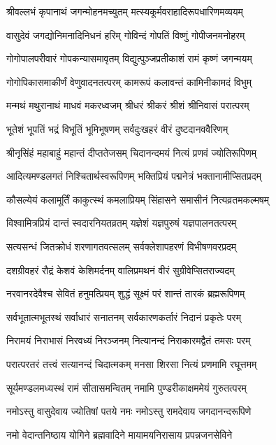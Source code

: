 \twolineshloka
{श्रीवल्लभं कृपानाथं जगन्मोहनमच्युतम्}
{मत्स्यकूर्मवराहादिरूपधारिणमव्ययम्}%

\twolineshloka
{वासुदेवं जगद्योनिमनादिनिधनं हरिम्}
{गोविन्दं गोपतिं विष्णुं गोपीजनमनोहरम्}%

\twolineshloka
{गोगोपालपरीवारं गोपकन्यासमावृतम्}
{विद्युत्पुञ्जप्रतीकाशं रामं कृष्णं जगन्मयम्}%

\twolineshloka
{गोगोपिकासमाकीर्णं वेणुवादनतत्परम्}
{कामरूपं कलावन्तं कामिनीकामदं विभुम्}%

\twolineshloka
{मन्मथं मथुरानाथं माधवं मकरध्वजम्}
{श्रीधरं श्रीकरं श्रीशं श्रीनिवासं परात्परम्}%

\twolineshloka
{भूतेशं भूपतिं भद्रं विभूतिं भूमिभूषणम्}
{सर्वदुःखहरं वीरं दुष्टदानववैरिणम्}%

\twolineshloka
{श्रीनृसिंहं महाबाहुं महान्तं दीप्ततेजसम्}
{चिदानन्दमयं नित्यं प्रणवं ज्योतिरूपिणम्}%

\twolineshloka
{आदित्यमण्डलगतं निश्चितार्थस्वरूपिणम्}
{भक्तिप्रियं पद्मनेत्रं भक्तानामीप्सितप्रदम्}%

\twolineshloka
{कौसल्येयं कलामूर्तिं काकुत्स्थं कमलाप्रियम्}
{सिंहासने समासीनं नित्यव्रतमकल्मषम्}%

\twolineshloka
{विश्वामित्रप्रियं दान्तं स्वदारनियतव्रतम्}
{यज्ञेशं यज्ञपुरुषं यज्ञपालनतत्परम्}%

\twolineshloka
{सत्यसन्धं जितक्रोधं शरणागतवत्सलम्}
{सर्वक्लेशापहरणं विभीषणवरप्रदम्}%

\twolineshloka
{दशग्रीवहरं रौद्रं केशवं केशिमर्दनम्}
{वालिप्रमथनं वीरं सुग्रीवेप्सितराज्यदम्}%

\twolineshloka
{नरवानरदेवैश्च सेवितं हनुमत्प्रियम्}
{शुद्धं सूक्ष्मं परं शान्तं तारकं ब्रह्मरूपिणम्}%

\twolineshloka
{सर्वभूतात्मभूतस्थं सर्वाधारं सनातनम्}
{सर्वकारणकर्तारं निदानं प्रकृतेः परम्}%

\twolineshloka
{निरामयं निराभासं निरवध्यं निरञ्जनम्}
{नित्यानन्दं निराकारमद्वैतं तमसः परम्}%

\twolineshloka
{परात्परतरं तत्त्वं सत्यानन्दं चिदात्मकम्}
{मनसा शिरसा नित्यं प्रणमामि रघूत्तमम्}%

\twolineshloka
{सूर्यमण्डलमध्यस्थं रामं सीतासमन्वितम्}
{नमामि पुण्डरीकाक्षममेयं गुरुतत्परम्}%

\twolineshloka
{नमोऽस्तु वासुदेवाय ज्योतिषां पतये नमः}
{नमोऽस्तु रामदेवाय जगदानन्दरूपिणे}%

\twolineshloka
{नमो वेदान्तनिष्ठाय योगिने ब्रह्मवादिने}
{मायामयनिरासाय प्रपन्नजनसेविने}%

